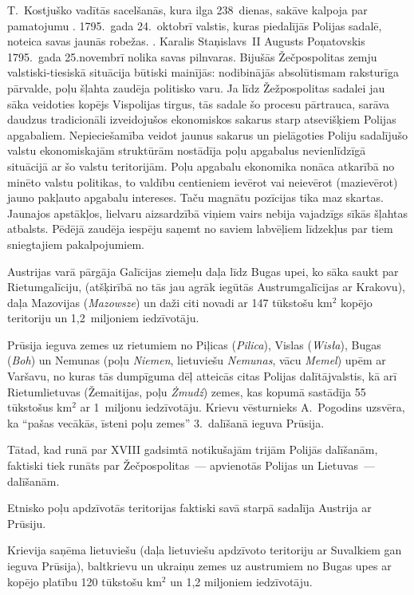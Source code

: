 \documentclass[twoside,a5paper,12pt,fleqn,openany]{extbook}
\newcommand{\pltxti}[1]{\textit{\textpolish{#1}}}
\newcommand{\detxti}[1]{\textit{\textgerman{#1}}}
\newcommand{\lttxti}[1]{\textit{\textlithuanian{#1}}}
\begin{document}
T.~Kostjuško vadītās sacelšanās, kura ilga 238~dienas, sakāve kalpoja par pamatojumu . 1795.~gada 24.~oktobrī valstis, kuras piedalījās Polijas sadalē, noteica savas jaunās robežas. . Karalis Staņislavs~II Augusts Poņatovskis 1795.~gada 25.novembrī nolika savas pilnvaras. Bijušās Žečpospolitas zemju valstiski-tiesiskā situācija būtiski mainījās: nodibinājās absolūtismam raksturīga pārvalde, poļu šļahta zaudēja politisko varu. Ja līdz Žežpospolitas sadalei jau sāka veidoties kopējs Vispolijas tirgus, tās sadale šo procesu pārtrauca, sarāva daudzus tradicionāli izveidojušos ekonomiskos sakarus starp atsevišķiem Polijas apgabaliem. Nepieciešamība veidot jaunus sakarus un pielāgoties Poliju sadalījušo valstu ekonomiskajām struktūrām nostādīja poļu apgabalus nevienlīdzīgā situācijā ar šo valstu teritorijām. Poļu apgabalu ekonomika nonāca atkarībā no minēto valstu politikas, to valdību centieniem ievērot vai neievērot (mazievērot) jauno pakļauto apgabalu intereses. Taču magnātu pozīcijas tika maz skartas. Jaunajos apstākļos, lielvaru aizsardzībā viņiem vairs nebija vajadzīgs sīkās šļahtas atbalsts. Pēdējā zaudēja iespēju saņemt no saviem labvēļiem līdzekļus par tiem sniegtajiem pakalpojumiem.

Austrijas varā pārgāja Galīcijas ziemeļu daļa līdz Bugas upei, ko sāka saukt par Rietumgalīciju, (atšķirībā no tās jau agrāk iegūtās Austrumgalīcijas ar Krakovu), daļa Mazovijas (\pltxti{Mazowsze}) un daži citi novadi ar 147 tūkstošu km$^{2}$ kopējo teritoriju un 1,2~miljoniem iedzīvotāju.

Prūsija ieguva zemes uz rietumiem no Piļicas (\pltxti{Pilica}), Vislas (\pltxti{Wisła}), Bugas (\pltxti{Boh}) un Nemunas (poļu \pltxti{Niemen}, lietuviešu \lttxti{Nemunas}, vācu \detxti{Memel}) upēm ar Varšavu, no kuras tās dumpīguma dēļ atteicās citas Polijas dalītājvalstis, kā arī Rietumlietuvas (Žemaitijas, poļu \pltxti{Żmudź}) zemes, kas kopumā sastādīja 55 tūkstošus km$^{2}$ ar 1~miljonu iedzīvotāju. Krievu vēsturnieks A.~Pogodins uzsvēra, ka ``pašas vecākās, īsteni poļu zemes'' 3.~dalīšanā ieguva Prūsija.

Tātad, kad runā par XVIII gadsimtā notikušajām trijām Polijās dalīšanām, faktiski tiek runāts par Žečpospolitas~--- apvienotās Polijas un Lietuvas~--- dalīšanām.

Etnisko poļu apdzīvotās teritorijas faktiski savā starpā sadalīja Austrija ar Prūsiju.

Krievija saņēma lietuviešu (daļa lietuviešu apdzīvoto teritoriju ar Suvalkiem gan ieguva Prūsija), baltkrievu un ukraiņu zemes uz austrumiem no Bugas upes ar kopējo platību 120 tūkstošu km$^{2}$ un 1,2 miljoniem iedzīvotāju.
\end{document}

